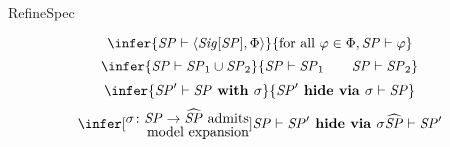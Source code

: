 \calculusAcronym{\SP_{{\vdash}}}




\maketitle

\begin{entry}{RefineSpec}  

\newcommand{\ang}[1]{\langle{#1}\rangle}
\newcommand{\Family}[2]{\ang{#1}_{#2}}
\newcommand{\SP}{\mathit{SP}}
\newcommand{\SPSig}[1]{{\mathit{Sig}}[#1]}
\newcommand{\SPMod}[1]{{\mathit{Mod}}[#1]}
\newcommand{\INS}{{\bf INS}}
\newcommand{\Sign}{{\bf Sign}}
\newcommand{\Sen}{{\bf Sen}}
\newcommand{\Set}{{\bf Set}}
\newcommand{\Mod}{{\bf Mod}}
\newcommand{\Cat}{{\bf Cat}}
\newcommand{\op}{\mathit{op}}
\newcommand{\pow}{{\mathit{Pow}}}
\newcommand{\translate}[2]{#1\textbf{\upshape{} with }#2}
\newcommand{\derive}[2]{#1\textbf{\upshape{} hide via }#2}
\newcommand{\union}[2]{#1 \cup #2}

\begin{calculus}

\[
\infer{\SP \vdash \ang{\SPSig{\SP},\Phi}}
      { \textrm{for all } \varphi \in \Phi, \SP \vdash \varphi}
\]
\[
\infer{\SP \vdash \union{\SP_1}{\SP_2}}
      {\SP \vdash \SP_1 \qquad \SP \vdash \SP_2}
\]
\[
\infer{\SP' \vdash \translate{\SP}{\sigma}}
      {\derive{\SP'}{\sigma} \vdash \SP}
\]
\[
\infer[\renewcommand{\arraystretch}{0.8}%
        \begin{array}{@{}l@{}}
           \sigma\colon\SP\rightarrow\widehat{\SP}
           \textrm{ admits} \\
           \hfill \textrm{model expansion}
        \end{array}]{\SP \vdash \derive{\SP'}{\sigma}}
                    {\widehat{\SP} \vdash \SP'}
\]

\end{calculus}


\end{entry}
